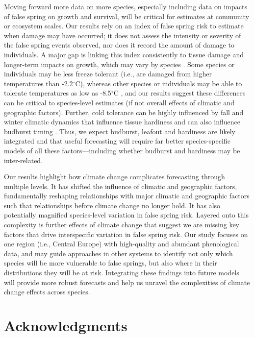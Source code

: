 \documentclass{article}\usepackage[]{graphicx}\usepackage[]{color}
\begin{document}
Moving forward more data on more species, especially including data on impacts of false spring on growth and survival, will be critical for estimates at community or ecosystem scales. Our results rely on an index of false spring risk to estimate when damage may have occurred; it does not assess the intensity or severity of the false spring events observed, nor does it record the amount of damage to individuals. A major gap is linking this index consistently to tissue damage and longer-term impacts on growth, which may vary by species \citep{Lenz2013,Korner2016,Bennett2018,Zhuo2018}. Some species or individuals may be less freeze tolerant (i.e., are damaged from higher temperatures than -2.2$^{\circ}$C), whereas other species or individuals may be able to tolerate temperatures as low as -8.5$^{\circ}$C \citep{Lenz2016}, and our results suggest these differences can be critical to species-level estimates (if not overall effects of climatic and geographic factors). Further, cold tolerance can be highly influenced by fall and winter climatic dynamics that influence tissue hardiness \citep{Charrier2011, Vitasse2014,Hofmann2015} and can also influence budburst timing \citep{Morin2007}. Thus, we expect budburst, leafout and hardiness are likely integrated and that useful forecasting will require far better species-specific models of all these factors---including whether budburst and hardiness may be inter-related. 

Our results highlight how climate change complicates forecasting through multiple levels. It has shifted the influence of climatic and geographic factors, fundamentally reshaping relationships with major climatic and geographic factors such that relationships before climate change no longer hold. It has also potentially magnified species-level variation in false spring risk. Layered onto this complexity is further effects of climate change that suggest we are missing key factors that drive interspecific variation in false spring risk. Our study focuses on one region (i.e., Central Europe) with high-quality and abundant phenological data, and may guide approaches in other systems to identify not only which species will be more vulnerable to false springs, but also where in their distributions they will be at risk. Integrating these findings into future models will provide more robust forecasts and help us unravel the complexities of climate change effects across species.

\section*{Acknowledgments}
\end{document}
